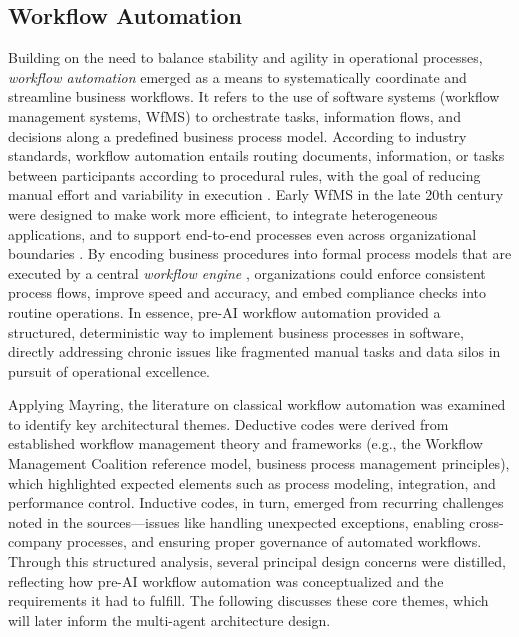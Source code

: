 \subsection{Workflow Automation}\label{subsec:workflow-auto}
Building on the need to balance stability and agility in operational processes, \textit{workflow automation} emerged as a means to systematically coordinate and streamline business workflows. It refers to the use of software systems (workflow management systems, WfMS) to orchestrate tasks, information flows, and decisions along a predefined business process model. According to industry standards, workflow automation entails routing documents, information, or tasks between participants according to procedural rules, with the goal of reducing manual effort and variability in execution \parencite{basuResearch2002}. Early WfMS in the late 20th century were designed to make work more efficient, to integrate heterogeneous applications, and to support end-to-end processes even across organizational boundaries \parencite{stohrWorkflow2001}. By encoding business procedures into formal process models that are executed by a central \textit{workflow engine} \parencite{basuResearch2002}, organizations could enforce consistent process flows, improve speed and accuracy, and embed compliance checks into routine operations. In essence, pre-AI workflow automation provided a structured, deterministic way to implement business processes in software, directly addressing chronic issues like fragmented manual tasks and data silos in pursuit of operational excellence.

Applying Mayring, the literature on classical workflow automation was examined to identify key architectural themes. Deductive codes were derived from established workflow management theory and frameworks (e.g., the Workflow Management Coalition reference model, business process management principles), which highlighted expected elements such as process modeling, integration, and performance control. Inductive codes, in turn, emerged from recurring challenges noted in the sources—issues like handling unexpected exceptions, enabling cross-company processes, and ensuring proper governance of automated workflows. Through this structured analysis, several principal design concerns were distilled, reflecting how pre-AI workflow automation was conceptualized and the requirements it had to fulfill. The following discusses these core themes, which will later inform the multi-agent architecture design.

